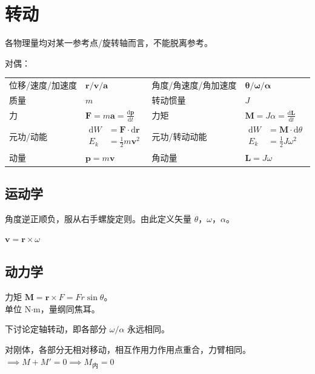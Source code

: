 \documentclass[12pt, a4paper, UTF8, openany]{ctexbook}
\newcommand{\dif}{\mathrm{d}}
\newcommand{\vect}[1]{\mathbf{#1}}
\newcommand{\vecr}{\vect{r}}
\newcommand{\vecv}{\vect{v}}
\newcommand{\veca}{\vect{a}}
\newcommand{\vecf}{\vect{F}}
\newcommand{\vecp}{\vect{p}}
\newcommand{\vecm}{\vect{M}}
\newcommand{\vecl}{\vect{L}}
\newcommand{\cross}{\times}
\begin{document}
    \section{转动}
    各物理量均对某一参考点/旋转轴而言，不能脱离参考。

    对偶：
    \begin{longtable}[h]{l l | l l}
        位移/速度/加速度 & $\vecr/\vecv/\veca$ & 
        角度/角速度/角加速度 & $\vect{\theta}/\vect{\omega}/\vect{\alpha}$ \\
        \addlinespace

        质量 & $m$ & 转动惯量 & $J$ \\
        \addlinespace

        力 & $\vecf = m \veca = \frac{\dif \vecp}{\dif t}$ & 
        力矩 & $\vecm = J \alpha = \frac{\dif \vecl}{\dif t}$ \\
        \addlinespace

        元功/动能 & $\begin{matrix} \dif W &= \vecf\cdot\dif\vecr \\ E_k &= \frac{1}{2}m \vecv^2 \end{matrix}$ & 
        元功/转动动能 & $\begin{matrix} \dif W &= \vecm\cdot\dif\theta \\ E_k &= \frac{1}{2}J\omega^2 \end{matrix}$ \\
        \addlinespace

        动量 & $\vecp = m \vecv$ & 角动量 & $\vecl = J \omega$
    \end{longtable}

        \subsection{运动学}
        角度逆正顺负，服从右手螺旋定则。由此定义矢量 $\theta$，$\omega$，$\alpha$。

        $\vecv = \vecr \cross \omega$

        \subsection{动力学}
        力矩 $\vecm = \vecr \cross F = Fr\sin\theta$。\\
        单位 N$\cdot$m，量纲同焦耳。

        下讨论定轴转动，即各部分 $\omega/\alpha$ 永远相同。

        对刚体，各部分无相对移动，相互作用力作用点重合，力臂相同。$\implies M + M' = 0 \implies M_{\text{内}} = 0$
\end{document}
